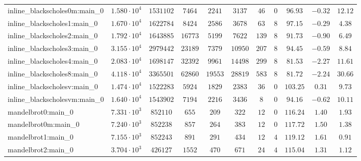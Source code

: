 \begin{tabular}{|l|c|c|c|c|c|c|c|c|c|c|}
inline\_blackscholes0m:main\_0 & $ 1.580 \cdot 10^{4} $ & $ 1531102  $ & $ 7464   $ & $ 2241   $ & $ 3137   $ & $ 46   $ & $ 0    $ & $ 96.93       $ & $ -0.32   $ & $ 12.12   $ \\
inline\_blackscholes1:main\_0  & $ 1.670 \cdot 10^{4} $ & $ 1622784  $ & $ 8424   $ & $ 2586   $ & $ 3678   $ & $ 63   $ & $ 8    $ & $ 97.15       $ & $ -0.29   $ & $ 4.38    $ \\
inline\_blackscholes2:main\_0  & $ 1.792 \cdot 10^{4} $ & $ 1643885  $ & $ 16773  $ & $ 5199   $ & $ 7622   $ & $ 139  $ & $ 8    $ & $ 91.73       $ & $ -0.90   $ & $ 6.49    $ \\
inline\_blackscholes3:main\_0  & $ 3.155 \cdot 10^{4} $ & $ 2979442  $ & $ 23189  $ & $ 7379   $ & $ 10950  $ & $ 207  $ & $ 8    $ & $ 94.45       $ & $ -0.59   $ & $ 8.84    $ \\
inline\_blackscholes4:main\_0  & $ 2.083 \cdot 10^{4} $ & $ 1698147  $ & $ 32392  $ & $ 9961   $ & $ 14498  $ & $ 299  $ & $ 8    $ & $ 81.53       $ & $ -2.27   $ & $ 11.61   $ \\
inline\_blackscholes8:main\_0  & $ 4.118 \cdot 10^{4} $ & $ 3365501  $ & $ 62860  $ & $ 19553  $ & $ 28819  $ & $ 583  $ & $ 8    $ & $ 81.72       $ & $ -2.24   $ & $ 30.66   $ \\
inline\_blackscholesv:main\_0  & $ 1.474 \cdot 10^{4} $ & $ 1522283  $ & $ 5924   $ & $ 1829   $ & $ 2383   $ & $ 36   $ & $ 0    $ & $ 103.25      $ & $ 0.31    $ & $ 9.73    $ \\
inline\_blackscholesvm:main\_0 & $ 1.640 \cdot 10^{4} $ & $ 1543902  $ & $ 7194   $ & $ 2216   $ & $ 3436   $ & $ 8    $ & $ 0    $ & $ 94.16       $ & $ -0.62   $ & $ 10.11   $ \\
mandelbrot0:main\_0            & $ 7.331 \cdot 10^{3} $ & $ 852110   $ & $ 655    $ & $ 209    $ & $ 322    $ & $ 12   $ & $ 0    $ & $ 116.24      $ & $ 1.40    $ & $ 1.93    $ \\
mandelbrot0m:main\_0           & $ 7.240 \cdot 10^{3} $ & $ 852238   $ & $ 857    $ & $ 264    $ & $ 383    $ & $ 12   $ & $ 0    $ & $ 117.72      $ & $ 1.50    $ & $ 1.38    $ \\
mandelbrot1:main\_0            & $ 7.155 \cdot 10^{3} $ & $ 852243   $ & $ 891    $ & $ 291    $ & $ 434    $ & $ 12   $ & $ 4    $ & $ 119.12      $ & $ 1.61    $ & $ 0.91    $ \\
mandelbrot2:main\_0            & $ 3.704 \cdot 10^{3} $ & $ 426127   $ & $ 1552   $ & $ 470    $ & $ 671    $ & $ 24   $ & $ 4    $ & $ 115.04      $ & $ 1.31    $ & $ 1.12    $ \\

\end{tabular}
